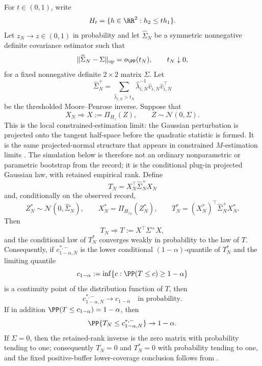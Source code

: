 \begin{lemma}\label{lem:projected-gaussian-bootstrap-halfspace-main}
For \(t\in(0,1)\), write
\[
H_t=\{h\in\RR^2:h_2\le th_1\}.
\]
Let \(z_N\to z\in(0,1)\) in probability and let
\(\widehat\Sigma_N\) be a symmetric nonnegative definite covariance estimator
such that
\[
\|\widehat\Sigma_N-\Sigma\|_{\operatorname{op}}=o_{\PP}(t_N),
\qquad t_N\downarrow0,
\]
for a fixed nonnegative definite \(2\times2\) matrix \(\Sigma\).  Let
\[
\widehat\Sigma_N^+
=\sum_{\widehat\lambda_{i,N}>t_N}
\widehat\lambda_{i,N}^{-1}
\widehat v_{i,N}\widehat v_{i,N}^{\top}
\]
be the thresholded Moore--Penrose inverse.  Suppose that
\[
X_N\Rightarrow X:=\Pi_{H_z}(Z),
\qquad Z\sim\mathcal N(0,\Sigma).
\]
This is the local constrained-estimation limit: the Gaussian perturbation is
projected onto the tangent half-space before the quadratic statistic is formed.
It is the same projected-normal structure that appears in constrained
\(M\)-estimation limits \cite{Geyer1994ConstrainedM}.  The simulation below is
therefore not an ordinary nonparametric or parametric bootstrap from the
record; it is the conditional plug-in projected Gaussian law, with retained
empirical rank.
Define
\[
T_N=X_N^\top\widehat\Sigma_N^+X_N
\]
and, conditionally on the observed record,
\[
Z_N^\ast\sim \mathcal N(0,\widehat\Sigma_N),\qquad
X_N^\ast=\Pi_{H_{z_N}}(Z_N^\ast),\qquad
T_N^\ast=(X_N^\ast)^\top\widehat\Sigma_N^+X_N^\ast .
\]
Then
\[
T_N\Rightarrow T:=X^\top\Sigma^+X,
\]
and the conditional law of \(T_N^\ast\) converges weakly in probability to
the law of \(T\).  Consequently, if \(c_{1-\alpha,N}^{\ast,-}\) is the lower
conditional \((1-\alpha)\)-quantile of \(T_N^\ast\) and the limiting quantile
\[
c_{1-\alpha}:=\inf\{c:\PP(T\le c)\ge1-\alpha\}
\]
is a continuity point of the distribution function of \(T\), then
\[
c_{1-\alpha,N}^{\ast,-}\to c_{1-\alpha}
\quad\text{in probability}.
\]
If in addition \(\PP(T\le c_{1-\alpha})=1-\alpha\), then
\[
\PP\{T_N\le c_{1-\alpha,N}^{\ast,-}\}\to1-\alpha .
\]
If \(\Sigma=0\), then the retained-rank inverse is the zero matrix with
probability tending to one; consequently \(T_N=0\) and \(T_N^\ast=0\) with
probability tending to one, and the fixed positive-buffer lower-coverage
conclusion follows from
.

\end{lemma}

